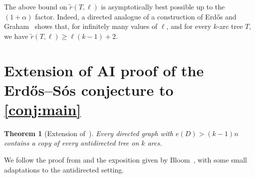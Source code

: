 \documentclass[11pt]{article}
\newtheorem{theorem}{Theorem}[section]
\numberwithin{equation}{section}
\theoremstyle{definition}
\begin{document}
The above bound on $\overleftrightarrow{r}(T,\ell)$ is asymptotically best possible up to the $(1+\alpha)$ factor. Indeed, a directed analogue of a construction of Erd\H{o}s and Graham~\cite{ErdosGraham1973} shows that, for infinitely many values of $\ell$, and for every $k$-arc tree $T$, we have $
\overleftrightarrow r(T,\ell)\ge \ell(k-1)+2$.

\section{Extension of AI proof of the Erd\H{o}s--S\'os conjecture to \cref{conj:main}}\label{sec:AI}

\begin{theorem}[Extension of~\cite{AI_pdf}]\label{thm:AI}
    Every directed graph with $e(D)> (k-1)n$ contains a copy of every antidirected tree on $k$ arcs.
\end{theorem}
We follow the proof from \cite{AI_pdf} and the exposition given by Bloom~\cite{proof_exposition}, with some small adaptations to the antidirected setting.
\end{document}

